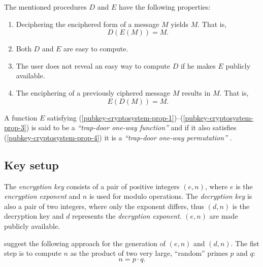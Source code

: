 The mentioned procedures $D$ and $E$ have the following properties:
\begin{enumerate}
\renewcommand{\theenumi}{\alph{enumi}}
\renewcommand{\labelenumi}{(\theenumi)}

\item Deciphering  the enciphered form of  a message $M$  yields $M$. That
  is,
  \begin{equation}
    \label{eq:1}
    D(E(M)) = M.
  \end{equation}
  \label{pubkey-cryptosystem-prop-1}
\item Both $D$ and $E$ are easy to compute.
  \label{pubkey-cryptosystem-prop-2}
\item The user does not reveal an  easy way to compute $D$ if he makes $E$
  publicly available.
  \label{pubkey-cryptosystem-prop-3}
\item  The enciphering  of a  previously ciphered  message $M$  results in
  $M$. That is,
  \begin{equation}
    \label{eq:2}
    E(D(M)) = M.
  \end{equation}
  \label{pubkey-cryptosystem-prop-4}
\end{enumerate}

A                  function                 $E$                 satisfying
(\ref{pubkey-cryptosystem-prop-1})--(\ref{pubkey-cryptosystem-prop-3})   is
said  to  be  a  \emph{``trap-door  one-way function''}  and  if  it  also
satisfies  (\ref{pubkey-cryptosystem-prop-4})  it  is a  \emph{``trap-door
  one-way permutation''} \cite{rivest77method,diffie76new}.

\subsection{Key setup}

The \emph{encryption  key} consists  of a pair  of positive  integers $(e,
n)$,  where $e$  is the  \emph{encryption exponent}  and $n$  is  used for
modulo  operations.  The \emph{decryption  key}  is  also  a pair  of  two
integers, where only the exponent differs, thus $(d, n)$ is the decryption
key and $d$  represents the \emph{decryption exponent}. $(e,  n)$ are made
publicly available.

\citet*{rivest77method} suggest the  following approach for the generation
of $(e, n)$ and  $(d, n)$. The fist step is to  compute $n$ as the product
of two very large, ``random'' primes $p$ and $q$:
\begin{equation*}
  \label{eq:compute-n}
n = p \cdot q.
\end{equation*}


